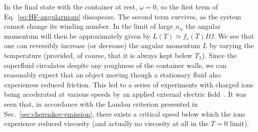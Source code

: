 In the final state with the container at rest, $\omega = 0$, so the
first term of Eq.~\eqref{eq:HF-angularmom} dissapears. The second term
survives, as the system cannot change its winding number. In the limit
of large $n_w$ the angular momentum will then be approximately given
by $L(T) \simeq f_s(T) I \Omega$. We see that one can reversibly
increase (or decrease) the angular momentum $L$ by varying the
temperature (provided, of course, that it is always kept below
$T_{\lambda}$).
%
%
Since the superfluid circulates despite any roughness of the container
walls, we can reasonably expect that an object moving though a
stationary fluid also experiences reduced friction. This led to a
series of experiments with charged ions being accelerated at various
speeds by an applied external electric field~\cite{Meyer1961,
  Allum1977}. It was seen that, in accordance with the Landau
criterion presented in Sec.~\ref{sec:cherenkov-emission}, there exists
a critical speed below which the ions experience reduced viscosity
(and actually no viscosity at all in the $T=0$ limit).



